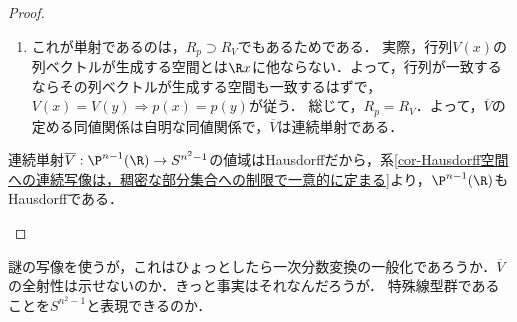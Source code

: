 \documentclass[uplatex,dvipdfmx]{jsreport}
\begin{document}
\begin{proof}
\begin{enumerate}
\begin{enumerate}[(1)]
            \item これが単射であるのは，$R_p\supset R_V$でもあるためである．
            実際，行列$V(x)$の列ベクトルが生成する空間とは$\R x$に他ならない．よって，行列が一致するならその列ベクトルが生成する空間も一致するはずで，$V(x)=V(y)\Rightarrow p(x)=p(y)$が従う．
            総じて，$R_p=R_V$．よって，$\overline{V}$の定める同値関係は自明な同値関係で，$\overline{V}$は連続単射である．
        \end{enumerate}
        連続単射$\overline{V}:\P^{n-1}(\R)\to S^{n^2-1}$の値域はHausdorffだから，系\ref{cor-Hausdorff空間への連続写像は，稠密な部分集合への制限で一意的に定まる}より，$\P^{n-1}(\R)$もHausdorffである．
    \end{enumerate}
\end{proof}
\begin{remarks}
    謎の写像を使うが，これはひょっとしたら一次分数変換の一般化であろうか．$\overline{V}$の全射性は示せないのか．きっと事実はそれなんだろうが．
    特殊線型群であることを$S^{n^2-1}$と表現できるのか．
\end{remarks}
\end{document}
